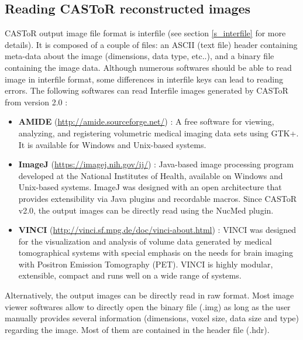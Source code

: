 \documentclass[a4paper, 11pt]{article}
\begin{document}
\subsection{Reading CASToR reconstructed images}
\label{ss_quickstart_readImages}

CASToR output image file format is interfile (see section \ref{s_interfile} for more details). It is composed of a couple of files: an ASCII (text file) header containing meta-data about the image (dimensions, data type, etc..), and a binary file containing the image data. Although numerous softwares should be able to read image in interfile format, some differences in interfile keys can lead to reading errors. The following softwares can read Interfile images generated by CASToR from version 2.0 :

\begin{itemize}
  \item \textbf{AMIDE} (\url{http://amide.sourceforge.net/}) : A free software for viewing, analyzing, and registering volumetric medical imaging data sets using GTK+. It is available for Windows and Unix-based systems.
  \item  \textbf{ImageJ} (\url{https://imagej.nih.gov/ij/}) : Java-based image processing program developed at the National Institutes of Health, available on Windows and Unix-based systems. ImageJ was designed with an open architecture that provides extensibility via Java plugins and recordable macros. Since CASToR v2.0, the output images can be directly read using the NucMed plugin.
  \item  \textbf{VINCI} (\url{http://vinci.sf.mpg.de/doc/vinci-about.html}) : VINCI was designed for the visualization and analysis of volume data generated by medical tomographical systems with special emphasis on the needs for brain imaging with Positron Emission Tomography (PET). VINCI is highly modular, extensible, compact and runs well on a wide range of systems.
\end{itemize}
 
Alternatively, the output images can be directly read in raw format. Most image viewer softwares allow to directly open the binary file (.img) as long as the user manually provides several information (dimensions, voxel size, data size and type) regarding the image. Most of them are contained in the header file (.hdr).
\end{document}
